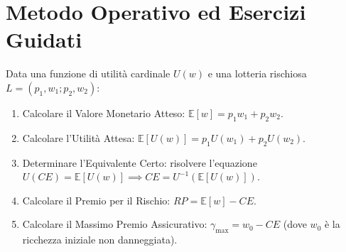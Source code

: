 \section{Metodo Operativo ed Esercizi Guidati}

\begin{metodo}
Data una funzione di utilità cardinale $U(w)$ e una lotteria rischiosa $L = (p_1, w_1; p_2, w_2)$:
\begin{enumerate}
    \item Calcolare il Valore Monetario Atteso: $\mathbb{E}[w] = p_1 w_1 + p_2 w_2$.
    \item Calcolare l'Utilità Attesa: $\mathbb{E}[U(w)] = p_1 U(w_1) + p_2 U(w_2)$.
    \item Determinare l'Equivalente Certo: risolvere l'equazione $U(CE) = \mathbb{E}[U(w)] \implies CE = U^{-1}(\mathbb{E}[U(w)])$.
    \item Calcolare il Premio per il Rischio: $RP = \mathbb{E}[w] - CE$.
    \item Calcolare il Massimo Premio Assicurativo: $\gamma_{\max} = w_0 - CE$ (dove $w_0$ è la ricchezza iniziale non danneggiata).
\end{enumerate}
\end{metodo}

